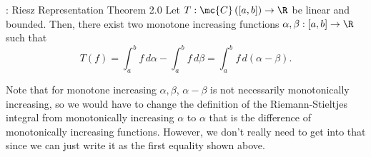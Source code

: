 \begin{ntheorem}{: Riesz Representation Theorem 2.0}
	Let \(T:\mc{C}\left([a,b]\right)\to\R\) be linear and bounded. Then, there exist two monotone increasing functions \(\alpha,\beta:[a,b]\to\R\) such that 
	\begin{equation*}
		T(f)=\int_a^b f \, d\alpha-\int_a^b f \, d\beta=\int_a^b f \, d(\alpha-\beta).
	\end{equation*}
\end{ntheorem}
\begin{note}
	Note that for monotone increasing \(\alpha,\beta\), \(\alpha-\beta\) is not necessarily monotonically increasing, so we would have to change the definition of the Riemann-Stieltjes integral from monotonically increasing \(\alpha\) to \(\alpha\) that is the difference of monotonically increasing functions. However, we don't really need to get into that since we can just write it as the first equality shown above.
\end{note}